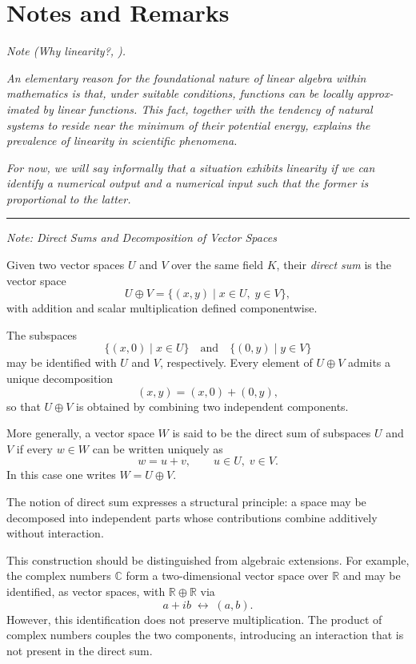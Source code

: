 \section*{Notes and Remarks}

\textit{Note (Why linearity?, \cite{oxford}).}

\textit{An elementary reason for the foundational nature of linear algebra
within mathematics is that, under suitable conditions, functions can be locally approx-
imated by linear functions. This fact, together with the tendency of natural systems to
reside near the minimum of their potential energy, explains the prevalence of linearity
in scientific phenomena.}

\medskip

\textit{For now, we will say informally that a situation exhibits linearity if we can identify a
numerical output and a numerical input such that the former is proportional to the
latter.}

\bigskip
\hrule
\medskip

\textit{Note: Direct Sums and Decomposition of Vector Spaces \cite{halmos}}

\medskip

Given two vector spaces $U$ and $V$ over the same field $K$,
their \emph{direct sum} is the vector space
\[
U \oplus V
=
\{(x,y) \mid x \in U,\; y \in V\},
\]
with addition and scalar multiplication defined componentwise.

\medskip

The subspaces
\[
\{(x,0) \mid x \in U\}
\quad\text{and}\quad
\{(0,y) \mid y \in V\}
\]
may be identified with $U$ and $V$, respectively.
Every element of $U \oplus V$ admits a unique decomposition
\[
(x,y) = (x,0) + (0,y),
\]
so that $U \oplus V$ is obtained by combining two independent components.

\medskip

More generally, a vector space $W$ is said to be the direct sum of subspaces
$U$ and $V$ if every $w \in W$ can be written uniquely as
\[
w = u + v,
\qquad
u \in U,\; v \in V.
\]
In this case one writes $W = U \oplus V$.

\medskip

The notion of direct sum expresses a structural principle:
a space may be decomposed into independent parts whose contributions
combine additively without interaction.

\medskip

This construction should be distinguished from algebraic extensions.
For example, the complex numbers $\mathbb{C}$ form a two-dimensional
vector space over $\mathbb{R}$ and may be identified, as vector spaces,
with $\mathbb{R} \oplus \mathbb{R}$ via
\[
a + ib \;\longleftrightarrow\; (a,b).
\]
However, this identification does not preserve multiplication.
The product of complex numbers couples the two components,
introducing an interaction that is not present in the direct sum.

